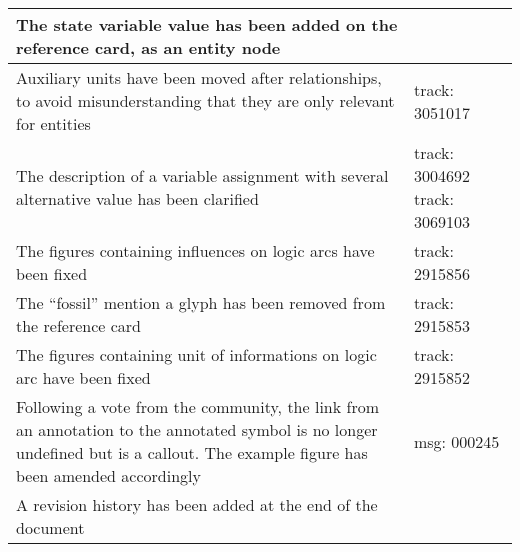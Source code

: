 \begin{center}
\label{tab:revision history 1.1}
\tablelasttail{\hline}
\begin{supertabular}{|p{0.75\textwidth}|p{0.25\textwidth}|}\hline
The state variable value has been added on the reference card, as an entity node & \\\hline
Auxiliary units have been moved after relationships, to avoid misunderstanding that they are only relevant for entities & track: 3051017\\\hline
The description of a variable assignment with several alternative value has been clarified & track: 3004692 \newline track: 3069103 \\\hline
The figures containing influences on logic arcs have been fixed & track: 2915856\\\hline
The ``fossil'' mention a glyph  has been removed from the reference card & track: 2915853\\\hline
The figures containing unit of informations on logic arc have been fixed &  track: 2915852 \\\hline
Following a vote from the community, the link from an annotation to the annotated symbol is no longer undefined but is a callout. The example figure has been amended accordingly & msg: 000245\\\hline
A revision history has been added at the end of the document& \\\hline
\end{supertabular}
\end{center}
